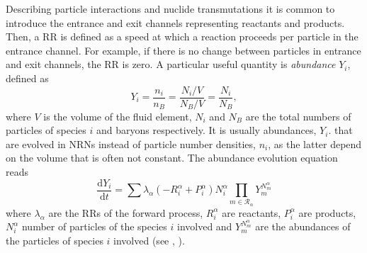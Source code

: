Describing particle interactions and nuclide transmutations it is 
common to introduce the entrance 
and exit channels representing reactants and products. Then, a \ac{RR} 
is defined as a speed at which a reaction proceeds per particle in the 
entrance channel. For example, if there is no change between particles 
in entrance and exit channels, the \ac{RR} is zero. 
%
A particular useful quantity is \textit{abundance} $Y_i$, defined as 
%
\begin{equation}
\label{eq:theory:nuc:abundance}
Y_i = \frac{n_i}{n_B} = \frac{N_i/V}{N_B/V} = \frac{N_i}{N_B},
\end{equation}
%
where $V$ is the volume of the fluid element, $N_i$ and $N_B$ are the 
total numbers of particles of species $i$ and baryons respectively. 
It is usually abundances, $Y_i$. that are evolved in \acp{NRN} instead of 
particle number densities, $n_i$, as the latter depend on the volume that 
is often not constant. 
%
The abundance evolution equation reads
%
\begin{equation}
\frac{\text{d}Y_i}{\text{d}t} = \sum\lambda_{\alpha}(-R_{i}^{\alpha}+P_{i}^{\alpha})N_{i}^{\alpha}\prod_{m\in\mathcal{R}_{\alpha}}Y_m^{N_{m}^{\alpha}}
\end{equation}
%
where $\lambda_{\alpha}$ are the \acp{RR} of the forward process, $R_{i}^{\alpha}$ are reactants, 
$P_{i}^{\alpha}$ are products, $N_{i}^{\alpha}$ number of particles of the species $i$ involved 
and $Y_m^{N_{m}^{\alpha}}$ are the abundances of the particles of species $i$ involved 
(see \eg, \citet{Hix:1999}).

